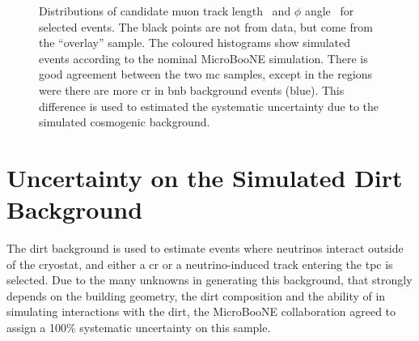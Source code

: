 \begin{figure}[t]
\centering
{} 
\caption[Selected Event Distributions with Simulated Neutrino and Data Cosmics Overlaid]{Distributions of candidate muon track length~\protect{} and $\phi$ angle~\protect{} for selected events. The black points are not from data, but come from the ``overlay'' sample. The coloured histograms show simulated events according to the nominal MicroBooNE simulation. There is good agreement between the two \acrshort{mc} samples, except in the regions were there are more \acrshort{cr} in \acrshort{bnb} background events (blue). This difference is used to estimated the systematic uncertainty due to the simulated cosmogenic background.}
\label{fig:overlay}
\end{figure}










\clearpage
\section[Uncertainty on Simulated Dirt]{Uncertainty on the Simulated Dirt Background}
\label{sec:error_dirt}


The dirt background is used to estimate events where neutrinos interact outside of the cryostat, and either a \acrshort{cr} or a neutrino-induced track entering the \acrshort{tpc} is selected. Due to the many unknowns in generating this background, that strongly depends on the building geometry, the dirt composition and the ability of \g in simulating interactions with the dirt, the MicroBooNE collaboration agreed to assign a 100\% systematic uncertainty on this sample.





